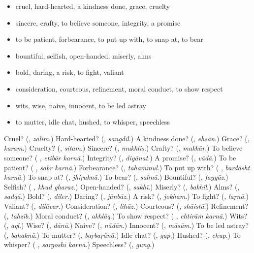 \begin{itemize}
\raggedright
  \item cruel, hard-hearted, a kindness done, grace, cruelty
  \item sincere, crafty, to believe someone, integrity, a promise
  \item to be patient, forbearance, to put up with, to snap at, to bear
  \item bountiful, selfish, open-handed, miserly, alms
  \item bold, daring, a risk, to fight, valiant
  \item consideration, courteous, refinement, moral conduct, to show respect
  \item wits, wise, naive, innocent, to be led astray
  \item to mutter, idle chat, hushed, to whisper, speechless
\end{itemize}

\begin{tcolorbox}[breakable,colback=teal!4,colframe=teal!35!black,title={Before you move on}]
Cruel? (\textbf{}, \emph{zālim}.) Hard-hearted? (\textbf{}, \emph{sangdil}.) A kindness done? (\textbf{}, \emph{ehsān}.) Grace? (\textbf{}, \emph{karam}.) Cruelty? (\textbf{}, \emph{sitam}.) Sincere? (\textbf{}, \emph{mukhlis}.) Crafty? (\textbf{}, \emph{makkār}.) To believe someone? (\textbf{ }, \emph{etibār karnā}.) Integrity? (\textbf{}, \emph{diyānat}.) A promise? (\textbf{}, \emph{vādā}.) To be patient? (\textbf{ }, \emph{sabr karnā}.) Forbearance? (\textbf{}, \emph{tahammul}.) To put up with? (\textbf{ }, \emph{bardāsht karnā}.) To snap at? (\textbf{}, \emph{jhiṛaknā}.) To bear? (\textbf{}, \emph{sahnā}.) Bountiful? (\textbf{}, \emph{fayyāz}.) Selfish? (\textbf{ }, \emph{khud gharaz}.) Open-handed? (\textbf{}, \emph{sakhī}.) Miserly? (\textbf{}, \emph{bakhīl}.) Alms? (\textbf{}, \emph{sadqā}.) Bold? (\textbf{}, \emph{diler}.) Daring? (\textbf{}, \emph{jānbāz}.) A risk? (\textbf{}, \emph{jokham}.) To fight? (\textbf{}, \emph{laṛnā}.) Valiant? (\textbf{}, \emph{dilāvar}.) Consideration? (\textbf{}, \emph{lihāz}.) Courteous? (\textbf{}, \emph{shāistā}.) Refinement? (\textbf{}, \emph{tahzīb}.) Moral conduct? (\textbf{}, \emph{akhlāq}.) To show respect? (\textbf{ }, \emph{ehtirām karnā}.) Wits? (\textbf{}, \emph{aql}.) Wise? (\textbf{}, \emph{dānā}.) Naive? (\textbf{}, \emph{nādān}.) Innocent? (\textbf{}, \emph{māsūm}.) To be led astray? (\textbf{}, \emph{bahaknā}.) To mutter? (\textbf{}, \emph{baṛbaṛānā}.) Idle chat? (\textbf{}, \emph{gap}.) Hushed? (\textbf{}, \emph{chup}.) To whisper? (\textbf{ }, \emph{sargoshī karnā}.) Speechless? (\textbf{}, \emph{gung}.)
\end{tcolorbox}
